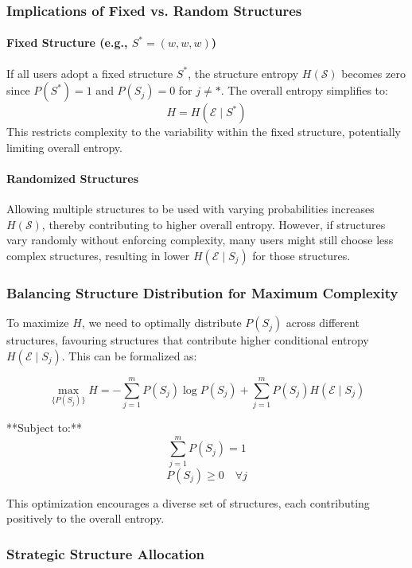 \subsubsection{Implications of Fixed vs. Random Structures}

\paragraph{Fixed Structure (e.g., \( S^* = (w, w, w) \))}

  If all users adopt a fixed structure \( S^* \), the structure entropy \( H(\mathcal{S}) \) becomes zero since \( P(S^*) = 1 \) and \( P(S_j) = 0 \) for \( j \neq * \). The overall entropy simplifies to:
  \[
  H = H(\mathcal{E} \mid S^*)
  \]
  This restricts complexity to the variability within the fixed structure, potentially limiting overall entropy.

\paragraph{Randomized Structures}

  Allowing multiple structures to be used with varying probabilities increases \( H(\mathcal{S}) \), thereby contributing to higher overall entropy. However, if structures vary randomly without enforcing complexity, many users might still choose less complex structures, resulting in lower \( H(\mathcal{E} \mid S_j) \) for those structures.

\subsubsection{Balancing Structure Distribution for Maximum Complexity}

To maximize \( H \), we need to optimally distribute \( P(S_j) \) across different structures, favouring structures that contribute higher conditional entropy \( H(\mathcal{E} \mid S_j) \). This can be formalized as:

\[
\max_{ \{ P(S_j) \} } H = - \sum_{j=1}^{m} P(S_j) \log P(S_j) + \sum_{j=1}^{m} P(S_j) H(\mathcal{E} \mid S_j)
\]

**Subject to:**
\[
\sum_{j=1}^{m} P(S_j) = 1
\]
\[
P(S_j) \geq 0 \quad \forall j
\]

This optimization encourages a diverse set of structures, each contributing positively to the overall entropy.

\subsubsection{Strategic Structure Allocation}


